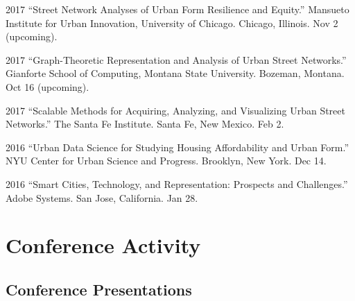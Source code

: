 \documentclass{academiccv}
\begin{document}
\begin{tablist}

\item[2017] \tab \enquote{Street Network Analyses of Urban Form Resilience and Equity.} Mansueto Institute for Urban Innovation, University of Chicago. Chicago, Illinois. Nov 2 (upcoming).

\item[2017] \tab \enquote{Graph-Theoretic Representation and Analysis of Urban Street Networks.} Gianforte School of Computing, Montana State University. Bozeman, Montana. Oct 16 (upcoming).

\item[2017] \tab \enquote{Scalable Methods for Acquiring, Analyzing, and Visualizing Urban Street Networks.} The Santa Fe Institute. Santa Fe, New Mexico. Feb 2.

\item[2016] \tab \enquote{Urban Data Science for Studying Housing Affordability and Urban Form.} NYU Center for Urban Science and Progress. Brooklyn, New York. Dec 14.

\item[2016] \tab \enquote{Smart Cities, Technology, and Representation: Prospects and Challenges.} Adobe Systems. San Jose, California. Jan 28.

\end{tablist}



\section*{Conference Activity}

\subsection*{Conference Presentations}
\end{document}
